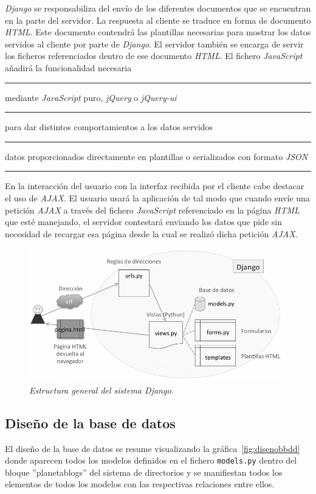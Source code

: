 \documentclass[a4paper, 12pt]{book}
\begin{document}
\textit{Django} se responsabiliza del env\'io de los diferentes documentos que se encuentran en la parte del servidor. La respuesta al cliente se traduce
en forma de documento \textit{HTML}. Este documento contendr\'a las plantillas necesarias para mostrar los datos servidos al cliente por parte de 
\textit{Django}. El servidor tambi\'en se encarga de servir los ficheros referenciados dentro de ese documento \textit{HTML}. El fichero \textit{JavaScript}
a\~nadir\'a la funcionalidad necesaria \rule[1mm]{4mm}{0.1mm}mediante \textit{JavaScript} puro, \textit{jQuery} o \textit{jQuery-ui}\rule[1mm]{4mm}{0.1mm}
para dar distintos comportamientos a los datos servidos \rule[1mm]{4mm}{0.1mm}datos proporcionados directamente en plantillas o serializados con formato
\textit{JSON}\rule[1mm]{4mm}{0.1mm}

En la interacci\'on del usuario con la interfaz recibida por el cliente cabe destacar el uso de \textit{AJAX}. El usuario usar\'a la aplicaci\'on de tal
modo que cuando env\'ie una petici\'on \textit{AJAX} a trav\'es del fichero \textit{JavaScript} referenciado en la p\'agina \textit{HTML} que est\'e manejando,
el servidor contestar\'a enviando los datos que pide sin necesidad de recargar esa p\'agina desde la cual se realiz\'o dicha petici\'on \textit{AJAX}.
\begin{figure}
  \centering
  \includegraphics[width=17cm, keepaspectratio]{img/diagrama}
  \caption{\textit{Estructura general del sistema \textit{Django}.}}
  \label{fig:introestructura}
\end{figure}


\subsection{Dise\~no de la base de datos} 
\label{sec:disenobbdd}
El dise\~no de la base de datos se resume visualizando la gr\'afica~\ref{fig:disenobbdd} donde aparecen todos los modelos definidos en el fichero 
\texttt{models.py} dentro del bloque ''planetablogs'' del sistema de directorios y se manifiestan todos los elementos de todos los modelos con las
respectivas relaciones entre ellos. 
\end{document}
